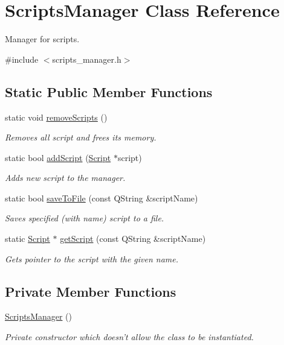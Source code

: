 \hypertarget{class_scripts_manager}{\section{Scripts\-Manager Class Reference}
\label{class_scripts_manager}
}


Manager for scripts.  




{\ttfamily \#include $<$scripts\-\_\-manager.\-h$>$}

\subsection*{Static Public Member Functions}
\begin{DoxyCompactItemize}
\item 
static void \hyperlink{class_scripts_manager_a137f7089f471de89c5d1344d3b5781cd}{remove\-Scripts} ()
\begin{DoxyCompactList}\small\item\em Removes all script and frees its memory. \end{DoxyCompactList}\item 
static bool \hyperlink{class_scripts_manager_a67b361d78d35092340feaf556b57565d}{add\-Script} (\hyperlink{class_script}{Script} $\ast$script)
\begin{DoxyCompactList}\small\item\em Adds new script to the manager. \end{DoxyCompactList}\item 
static bool \hyperlink{class_scripts_manager_ad4cd01aab1d6015db90cbca5fae306cf}{save\-To\-File} (const Q\-String \&script\-Name)
\begin{DoxyCompactList}\small\item\em Saves specified (with name) script to a file. \end{DoxyCompactList}\item 
static \hyperlink{class_script}{Script} $\ast$ \hyperlink{class_scripts_manager_a59b613ef7638d97bbdebe09a412e8f20}{get\-Script} (const Q\-String \&script\-Name)
\begin{DoxyCompactList}\small\item\em Gets pointer to the script with the given name. \end{DoxyCompactList}\end{DoxyCompactItemize}
\subsection*{Private Member Functions}
\begin{DoxyCompactItemize}
\item 
\hyperlink{class_scripts_manager_a6c0f74bb1ba41b0c29f388fc9b973489}{Scripts\-Manager} ()
\begin{DoxyCompactList}\small\item\em Private constructor which doesn't allow the class to be instantiated. \end{DoxyCompactList}\end{DoxyCompactItemize}
